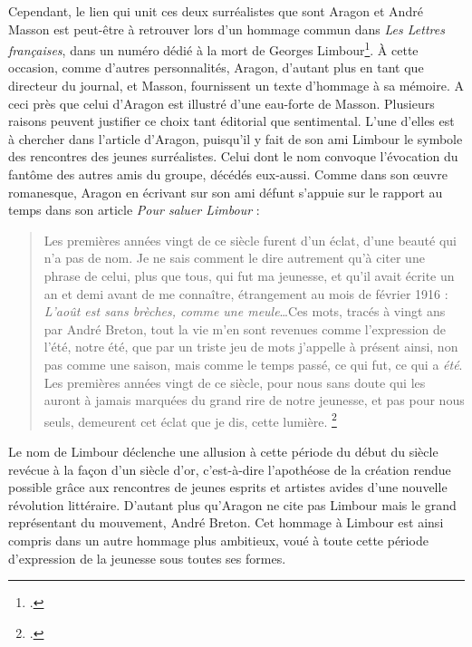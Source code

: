 	Cependant, le lien qui unit ces deux surréalistes que sont Aragon et André Masson est peut-être à retrouver lors d’un hommage commun dans \emph{Les Lettres françaises}, dans un numéro dédié à la mort de Georges Limbour\footcite{journallimbour}. À cette occasion, comme d’autres personnalités, Aragon, d’autant plus en tant que directeur du journal, et Masson, fournissent un texte d’hommage à sa mémoire. A ceci près que celui d’Aragon est illustré d’une eau-forte de Masson. Plusieurs raisons peuvent justifier ce choix tant éditorial que sentimental. L’une d’elles est à chercher dans l’article d’Aragon, puisqu'il y fait de son ami Limbour le symbole des rencontres des jeunes surréalistes. Celui dont le nom convoque l’évocation du fantôme des autres amis du groupe, décédés eux-aussi. Comme dans son \oe{}uvre romanesque, Aragon en écrivant sur son ami défunt s’appuie sur le rapport au temps dans son article \emph{Pour saluer Limbour} : 


	\begin{quote}
	Les premières années vingt de ce siècle furent d’un éclat, d’une beauté qui n’a pas de nom. Je ne sais comment le dire autrement qu’à citer une phrase de celui, plus que tous, qui fut ma jeunesse, et qu’il avait écrite un an et demi avant de me connaître, étrangement au mois de février 1916 : \emph{L’août est sans brèches, comme une meule}…Ces mots, tracés à vingt ans par André Breton, tout la vie m’en sont revenues comme l’expression de l’été, notre été, que par un triste jeu de mots j’appelle à présent ainsi, non pas comme une saison, mais comme le temps passé, ce qui fut, ce qui a \emph{été}. Les premières années vingt de ce siècle, pour nous sans doute qui les auront à jamais marquées du grand rire de notre jeunesse, et pas pour nous seuls, demeurent cet éclat que je dis, cette lumière. 	
	\footcite[p3]{journallimbour}\end{quote}

	Le nom de Limbour déclenche une allusion à cette période du début du siècle revécue à la façon d’un siècle d’or, c’est-à-dire l’apothéose de la création rendue possible grâce aux rencontres de jeunes esprits et artistes avides d’une nouvelle révolution littéraire. D’autant plus qu’Aragon ne cite pas Limbour mais le grand représentant du mouvement, André Breton. Cet hommage à Limbour est ainsi compris dans un autre hommage plus ambitieux, voué à toute cette période d’expression de la jeunesse sous toutes ses formes. 

